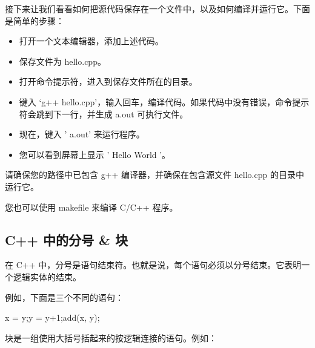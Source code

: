 \documentclass[
]{article}
\newenvironment{Shaded}{}{}
\newcommand{\DecValTok}[1]{\textcolor[rgb]{0.25,0.63,0.44}{#1}}
\newcommand{\ErrorTok}[1]{\textcolor[rgb]{1.00,0.00,0.00}{\textbf{#1}}}
\newcommand{\NormalTok}[1]{#1}
\newcommand{\OperatorTok}[1]{\textcolor[rgb]{0.40,0.40,0.40}{#1}}
\providecommand{\tightlist}{%
  \setlength{\itemsep}{0pt}\setlength{\parskip}{0pt}}
\begin{document}
接下来让我们看看如何把源代码保存在一个文件中，以及如何编译并运行它。下面是简单的步骤：

\begin{itemize}
\tightlist
\item
  打开一个文本编辑器，添加上述代码。
\item
  保存文件为 hello.cpp。
\item
  打开命令提示符，进入到保存文件所在的目录。
\item
  键入 `g++
  hello.cpp'，输入回车，编译代码。如果代码中没有错误，命令提示符会跳到下一行，并生成
  a.out 可执行文件。
\item
  现在，键入 ' a.out' 来运行程序。
\item
  您可以看到屏幕上显示 ' Hello World '。
\end{itemize}

\begin{Shaded}
\end{Shaded}

请确保您的路径中已包含 g++ 编译器，并确保在包含源文件 hello.cpp
的目录中运行它。

您也可以使用 makefile 来编译 C/C++ 程序。

\hypertarget{c-ux4e2dux7684ux5206ux53f7-ux5757}{%
\subsection{C++ 中的分号 \&
块}\label{c-ux4e2dux7684ux5206ux53f7-ux5757}}

在 C++
中，分号是语句结束符。也就是说，每个语句必须以分号结束。它表明一个逻辑实体的结束。

例如，下面是三个不同的语句：

\begin{Shaded}
\begin{Highlighting}[]
\NormalTok{x }\OperatorTok{=}\NormalTok{ y}\OperatorTok{;}\NormalTok{y }\OperatorTok{=}\NormalTok{ y}\OperatorTok{+}\DecValTok{1}\OperatorTok{;}\NormalTok{add}\OperatorTok{(}\NormalTok{x}\OperatorTok{,}\NormalTok{ y}\OperatorTok{);}
\end{Highlighting}
\end{Shaded}

块是一组使用大括号括起来的按逻辑连接的语句。例如：
\end{document}
